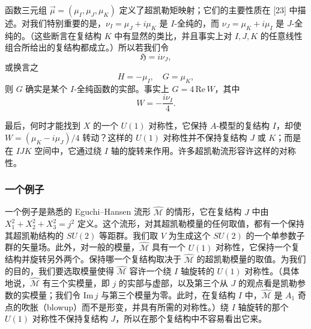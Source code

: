 \documentclass[11pt,a4paper,UTF8]{ctexart}
\theoremstyle{plain}
\theoremstyle{definition}
\begin{document}

函数三元组 $\vec\mu=(\mu_I,\mu_J,\mu_K)$ 定义了超凯勒矩映射；它们的主要性质在 [23] 中描述。对我们特别重要的是，$\nu_I=\mu_J+i\mu_K$ 是 $I$-全纯的，而 $\nu_J=\mu_K+i\mu_I$ 是 $J$-全纯的。（这些断言在复结构 $K$ 中有显然的类比，并且事实上对 $I,J,K$ 的任意线性组合所给出的复结构都成立。）所以若我们令
\begin{equation}
    \mathfrak{H}=i\nu_J,
    \tag{3.16}
\end{equation}
或换言之
\begin{equation}
    H=-\mu_I,\quad G=\mu_K,
    \tag{3.17}
\end{equation}
则 $G$ 确实是某个 $I$-全纯函数的实部。事实上 $G=4\,\mathrm{Re}\,W$，其中
\begin{equation}
    W=-\frac{i\nu_I}{4}.
    \tag{3.18}
\end{equation}



最后，何时才能找到 $X$ 的一个 $U(1)$ 对称性，它保持 $A$-模型的复结构 $I$，却使 $W=(\mu_K-i\mu_J)/4$ 转动？这样的 $U(1)$ 对称性并不保持复结构 $J$ 或 $K$；而是在 $IJK$ 空间中，它通过绕 $I$ 轴的旋转来作用。许多超凯勒流形容许这样的对称性。

\subsubsection{一个例子}

一个例子是熟悉的 Eguchi–Hansen 流形 $\widehat{\mathcal{M}}$ 的情形，它在复结构 $J$ 中由 $X_1^2+X_2^2+X_3^2=j^2$ 定义。这个流形，对其超凯勒模量的任何取值，都有一个保持其超凯勒结构的 $SU(2)$ 等距群。我们取 $V$ 为生成这个 $SU(2)$ 的一个单参数子群的矢量场。此外，对一般的模量，$\widehat{\mathcal{M}}$ 具有一个 $U(1)$ 对称性，它保持一个复结构并旋转另外两个。保持哪一个复结构取决于 $\widehat{\mathcal{M}}$ 的超凯勒模量的取值。为我们的目的，我们要选取模量使得 $\widehat{\mathcal{M}}$ 容许一个绕 $I$ 轴旋转的 $U(1)$ 对称性。（具体地说，$\widehat{\mathcal{M}}$ 有三个实模量，即 $j$ 的实部与虚部，以及第三个从 $J$ 的观点看是凯勒参数的实模量；我们令 $\mathrm{Im}\,j$ 与第三个模量为零。此时，在复结构 $I$ 中，$\widehat{\mathcal{M}}$ 是 $A_1$ 奇点的吹胀（blowup）而不是形变，并具有所需的对称性。）绕 $I$ 轴旋转的那个 $U(1)$ 对称性不保持复结构 $J$，所以在那个复结构中不容易看出它来。
\end{document}

